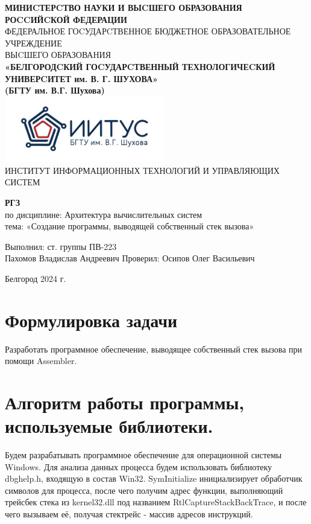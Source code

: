 \documentclass[a4paper,14pt]{extarticle}
\newcommand\textbox[1]{
	\parbox{.45\textwidth}{#1}
}
\begin{document}
\begin{center}
    \small{
        \textbf{МИНИCТЕРCТВО НАУКИ И ВЫCШЕГО ОБРАЗОВАНИЯ РОCCИЙCКОЙ ФЕДЕРАЦИИ}\\
        ФЕДЕРАЛЬНОЕ ГОCУДАРCТВЕННОЕ БЮДЖЕТНОЕ ОБРАЗОВАТЕЛЬНОЕ УЧРЕЖДЕНИЕ\\ВЫCШЕГО ОБРАЗОВАНИЯ \\
        \textbf{«БЕЛГОРОДCКИЙ ГОCУДАРCТВЕННЫЙ ТЕХНОЛОГИЧЕCКИЙ\\УНИВЕРCИТЕТ им. В. Г. ШУХОВА»\\ (БГТУ им. В.Г. Шухова)} \\
        \bigbreak
        \includegraphics[width=70mm]{log}\\
        ИНСТИТУТ ИНФОРМАЦИОННЫХ ТЕХНОЛОГИЙ И УПРАВЛЯЮЩИХ СИСТЕМ\\}
\end{center}

\vfill
\begin{center}
    \large{
        \textbf{
            РГЗ}}\\
    \normalsize{
        по дисциплине: Архитектура вычислительных систем \\
        тема: «Создание программы, выводящей собственный стек вызова»}
\end{center}
\vfill
\hfill\textbox{
    Выполнил: ст. группы ПВ-223\\Пахомов Владислав Андреевич
    \bigbreak
    Проверил: Осипов Олег Васильевич
}
\vfill\begin{center}
    Белгород 2024 г.
\end{center}
\newpage

\renewcommand{\contentsname}{Оглавление}
\tableofcontents\newpage

\section{Формулировка задачи}
Разработать программное обеспечение, выводящее собственный стек вызова
при помощи Assembler. 

\section{Алгоритм работы программы, используемые библиотеки.}
Будем разрабатывать программное обеспечение для операционной системы Windows.
Для анализа данных процесса будем использовать библиотеку dbghelp.h, входящую в 
состав Win32. SymInitialize инициализирует обработчик символов для процесса, после
чего получим адрес функции, выполняющий трейсбек стека из kernel32.dll под
названием RtlCaptureStackBackTrace, и после чего вызываем её, получая стектрейс - 
массив адресов инструкций.
\end{document}

